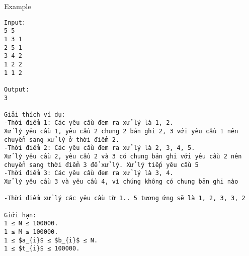 Example
\begin{verbatim}
Input:
5 5
1 3 1
2 5 1
3 4 2
1 2 2
1 1 2

Output:
3

Giải thích ví dụ: 
-Thời điểm 1: Các yêu cầu đem ra xử lý là 1, 2.
Xử lý yêu cầu 1, yêu cầu 2 chung 2 bản ghi 2, 3 với yêu cầu 1 nên chuyển sang xử lý ở thời điểm 2.
-Thời điểm 2: Các yêu cầu đem ra xử lý là 2, 3, 4, 5.
Xử lý yêu cầu 2, yêu cầu 2 và 3 có chung bản ghi với yêu cầu 2 nên chuyển sang thời điểm 3 để xử lý. Xử lý tiếp yêu cầu 5
-Thời điểm 3: Các yêu cầu đem ra xử lý là 3, 4.
Xử lý yêu cầu 3 và yêu cầu 4, vì chúng không có chung bản ghi nào

-Thời điểm xử lý các yêu cầu từ 1.. 5 tương ứng sẽ là 1, 2, 3, 3, 2

Giới hạn:
1 ≤ N ≤ 100000. 
1 ≤ M ≤ 100000.
1 ≤ $a_{i}$ ≤ $b_{i}$ ≤ N. 
1 ≤ $t_{i}$ ≤ 100000. 

\end{verbatim}